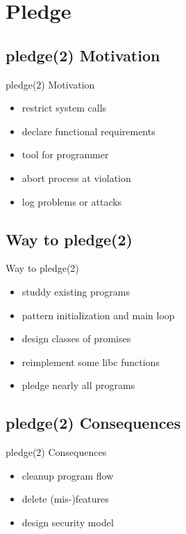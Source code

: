 \documentclass[14pt]{beamer}
\begin{document}
\section{Pledge}

\subsection{pledge(2) Motivation}
\begin{frame}{pledge(2) Motivation}
\begin{itemize}
    \item restrict system calls
    \item declare functional requirements
    \item tool for programmer
    \item abort process at violation
    \item log problems or attacks
\end{itemize}
\end{frame}

\subsection{Way to pledge(2)}
\begin{frame}{Way to pledge(2)}
\begin{itemize}
    \item studdy existing programs
    \item pattern initialization and main loop
    \item design classes of promises
    \item reimplement some libc functions
    \item pledge nearly all programs
\end{itemize}
\end{frame}

\subsection{pledge(2) Consequences}
\begin{frame}{pledge(2) Consequences}
\begin{itemize}
    \item cleanup program flow
    \item delete (mis-)features
    \item design security model
\end{itemize}
\end{frame}
\end{document}
